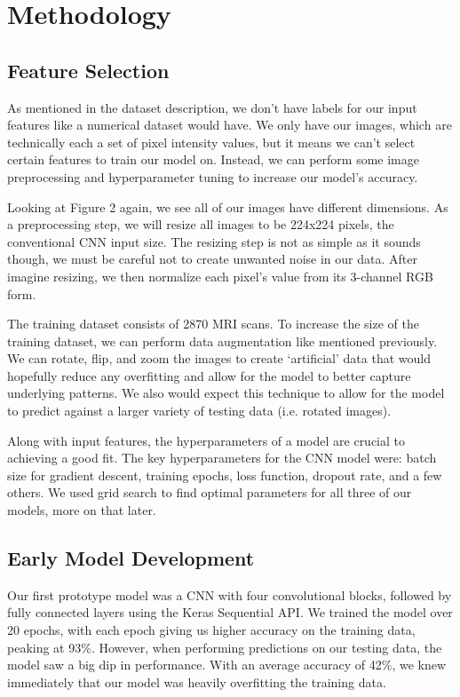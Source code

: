 \documentclass[conference]{IEEEtran}
\begin{document}
\section{\large Methodology}

\subsection{\large Feature Selection}

As mentioned in the dataset description, we don't have labels for our input features like a numerical dataset would have. We only have our images, which are technically each a set of pixel intensity values, but it means we can't select certain features to train our model on. Instead, we can perform some image preprocessing and hyperparameter tuning to increase our model's accuracy.

Looking at Figure 2 again, we see all of our images have different dimensions. As a preprocessing step, we will resize all images to be 224x224 pixels, the conventional CNN input size. The resizing step is not as simple as it sounds though, we must be careful not to create unwanted noise in our data. After imagine resizing, we then normalize each pixel's value from its 3-channel RGB form.

The training dataset consists of 2870 MRI scans. To increase the size of the training dataset, we can perform data augmentation like mentioned previously. We can rotate, flip, and zoom the images to create `artificial' data that would hopefully reduce any overfitting and allow for the model to better capture underlying patterns. We also would expect this technique to allow for the model to predict against a larger variety of testing data (i.e. rotated images). 

Along with input features, the hyperparameters of a model are crucial to achieving a good fit. The key hyperparameters for the CNN model were: batch size for gradient descent, training epochs, loss function, dropout rate, and a few others. We used grid search to find optimal parameters for all three of our models, more on that later. 

\subsection{\large Early Model Development}

Our first prototype model was a CNN with four convolutional blocks, followed by fully connected layers using the Keras Sequential API. We trained the model over 20 epochs, with each epoch giving us higher accuracy on the training data, peaking at 93\%. However, when performing predictions on our testing data, the model saw a big dip in performance. With an average accuracy of 42\%, we knew immediately that our model was heavily overfitting the training data.
\end{document}
